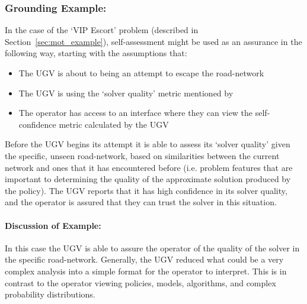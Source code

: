 


\subsubsection{Grounding Example:}
In the case of the `VIP Escort' problem (described in Section~\ref{sec:mot_example}), self-assessment might be used as an assurance in the following way, starting with the assumptions that:

\begin{itemize}
    \item The UGV is about to being an attempt to escape the road-network
    \item The UGV is using the `solver quality' metric mentioned by \citet{Aitken2016-fb}
    \item The operator has access to an interface where they can view the self-confidence metric calculated by the UGV
\end{itemize}

Before the UGV begins its attempt it is able to assess its `solver quality' given the specific, unseen road-network, based on similarities between the current network and ones that it has encountered before (i.e. problem features that are important to determining the quality of the approximate solution produced by the policy). The UGV reports that it has high confidence in its solver quality, and the operator is assured that they can trust the solver in this situation.

\paragraph{\textbf{Discussion of Example:}} In this case the UGV is able to assure the operator of the quality of the solver in the specific road-network. Generally, the UGV reduced what could be a very complex analysis into a simple format for the operator to interpret. This is in contrast to the operator viewing policies, models, algorithms, and complex probability distributions.

